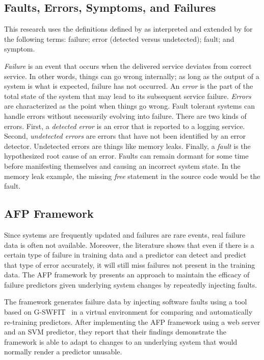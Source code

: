 \subsection{Faults, Errors, Symptoms, and Failures}
This research uses the definitions defined by \citet{avivzienis2004basic} as
interpreted and extended by \citet{salfnerSurvey} for the following terms:
failure; error (detected versus undetected); fault; and symptom.

\emph{Failure} is an event that occurs when the delivered service deviates from
correct service.  In other words, things can go wrong internally; as long as
the output of a system is what is expected, failure has not occurred.  An
\emph{error} is the part of the total state of the system that may lead to its
subsequent service failure.  \emph{Errors} are characterized as the point when
things go wrong.  Fault tolerant systems can handle errors without necessarily
evolving into failure.  There are two kinds of errors.  First, a \emph{detected
error} is an error that is reported to a logging service.  Second,
\emph{undetected errors} are errors that have not been identified by an error
detector.  Undetected errors are things like memory leaks.  Finally, a
\emph{fault} is the hypothesized root cause of an error.  Faults can remain
dormant for some time before manifesting themselves and causing an incorrect
system state.  In the memory leak example, the missing \emph{free} statement in
the source code would be the fault.  

\subsection{\acrfull{AFP} Framework} \label{afp}
Since systems are frequently updated and failures are rare events, real failure
data is often not available.  Moreover, the literature shows that even if there
is a certain type of failure in training data and a predictor can detect and
predict that type of error accurately, it will still miss failures not present
in the training data.  The \ac{AFP} framework by \citet{irrera2015} presents an
approach to maintain the efficacy of failure predictors given underlying system
changes by repeatedly injecting faults.

The framework generates failure data by injecting software faults using a tool
based on \ac{G-SWFIT}~\citep{gswfit} in a virtual environment for comparing and
automatically re-training predictors.  After implementing the \ac{AFP}
framework using a web server and an \ac{SVM} predictor, they report that their
findings demonstrate the framework is able to adapt to changes to an underlying
system that would normally render a predictor unusable.

